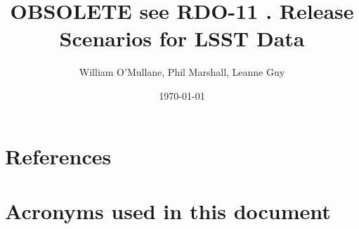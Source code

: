 \documentclass[OPS,obsolete,toc]{lsstdoc}
\title{OBSOLETE see RDO-11 . Release Scenarios for LSST Data}
\author{%
William O'Mullane, Phil Marshall, Leanne Guy
}
\date{\today}
\begin{document}

\mkshorttitle




\appendix
\section{References} \label{sec:bib}


\section{Acronyms used in this document}\label{sec:acronyms}

\end{document}
